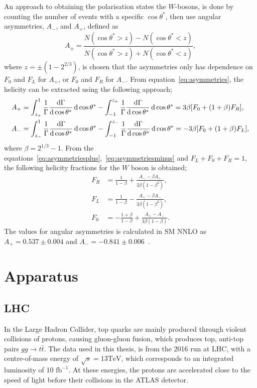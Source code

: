 \documentclass[12pt,a4paper]{article}
\numberwithin{equation}{section}
\begin{document}
An approach to obtaining the polarisation states the $W$-bosons, is done by
counting the number of events with a specific $\cos \theta^*$, then use angular
asymmetries, $A_-$, and $A_+$, defined as
\begin{equation}\label{eq:asymmetries}
  A_{\pm}=\frac{N(\cos \theta^* > z)-N(\cos \theta^* < z)}{N(\cos \theta^* > z)+N(\cos \theta^* < z)},
\end{equation}
where $z=\pm(1-2^{2/3})$, is chosen that the asymmetries only has dependence on
$F_0$ and $F_L$ for $A_+$, or $F_0$ and $F_R$ for $A_-$. From
equation~\eqref{eq:asymmetries}, the helicity can be extracted using the
following approach;
\begin{align}
\label{eq:asymmetriesplus}
  A_+ &= \int^1_{z_+} \frac{1}{\Gamma}\dv{\Gamma}{\cos \theta^*} \dd{\cos \theta^{*}} - \int^{z_+}_{-1}
      \frac{1}{\Gamma}\dv{\Gamma}{\cos \theta^*} \dd{\cos \theta^{*}} = 3\beta [F_0 + (1+\beta)F_R],\\
\label{eq:asymmetriesminus}
  A_- &= \int^1_{z_-} \frac{1}{\Gamma}\dv{\Gamma}{\cos \theta^*} \dd{\cos \theta^{*}} - \int^{z_-}_{-1}
      \frac{1}{\Gamma}\dv{\Gamma}{\cos \theta^*} \dd{\cos \theta^{*}} = -3\beta [F_0 + (1+\beta)F_L],
\end{align}
where $\beta = 2^{1/3}-1$. From the
equations~\eqref{eq:asymmetriesplus},~\eqref{eq:asymmetriesminus} and
$F_L+F_0+F_R=1$, the following helicity fractions for the $W$ boson is obtained;
\begin{align}
  F_R&=\frac{1}{1-\beta}+\frac{A_- - \beta A_+}{3\beta (1-\beta^2)},\\
  F_L&=\frac{1}{1-\beta}-\frac{A_+ - \beta A_-}{3\beta (1-\beta^2)},\\
  F_0&=-\frac{1+\beta}{1-\beta}+\frac{A_+ - A_-}{3\beta (1-\beta)}.
\end{align}
The values for angular asymmetries is calculated in SM
NNLO as $A_+=0.537 \pm 0.004$ and
$A_-=-0.841 \pm 0.006$~\cite[24]{CastroNunesFiolhais:1544047}.

\section{Apparatus}
\subsection{LHC}
In the Large Hadron Collider, top quarks are mainly produced through violent
collisions of protons, causing gluon-gluon fusion, which produces top, anti-top
pairs $gg \rightarrow t\bar t$. The data used in this thesis, is from the 2016 run at LHC,
with a centre-of-mass energy of $\sqrt s = 13 \mathrm{TeV}$, which corresponds
to an integrated luminosity of 10 $\mathrm{fb}^{-1}$\cite{oreach2020}. At these
energies, the protons are accelerated close to the speed of light before their
collisions in the ATLAS detector.\\
\end{document}
